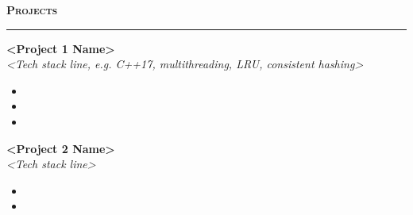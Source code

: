 \documentclass[letterpaper,11pt]{article}
\newcommand{\resumesection}[1]{%
  \vspace{4pt}%
  {\large\scshape\textbf{#1}}%
  \vspace{1pt}\hrule height 0.6pt\vspace{4pt}%
}
\newcommand{\entryheading}[4]{%
  \textbf{#1}\hfill #2\\[1pt]
  \textit{#3}\hfill \textit{#4}\vspace{2pt}%
}
\newenvironment{entrybullets}{%
  \begin{itemize}[leftmargin=1.4em,itemsep=1pt,topsep=1pt,parsep=0pt]%
}{\end{itemize}\vspace{3pt}}
\begin{document}
\resumesection{Projects}

\entryheading{<Project 1 Name>}{<Mon 20XX -- Mon 20XX>}{<Tech stack line, e.g. C++17, multithreading, LRU, consistent hashing>}{}
\begin{entrybullets}
  \item <Core design + quantified result>
  \item <Second bullet>
  \item <Third bullet>
\end{entrybullets}

\entryheading{<Project 2 Name>}{<Mon 20XX -- Mon 20XX>}{<Tech stack line>}{}
\begin{entrybullets}
  \item <Core design + quantified result>
  \item <Second bullet>
\end{entrybullets}
\end{document}
